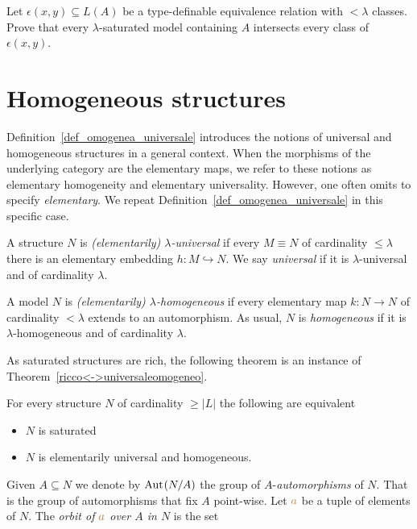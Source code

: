 \begin{exercise}
  Let $\epsilon(x,y)\subseteq L(A)$ be a type-definable equivalence relation with $<\lambda$ classes.
  Prove that every $\lambda$-saturated model containing $A$ intersects every class of $\epsilon(x,y)$.
\end{exercise}

\section{Homogeneous structures}\label{homogeneous}
Definition~\ref{def_omogenea_universale} introduces the notions of universal and homogeneous structures in a general context.
When the morphisms of the underlying category are the elementary maps, we refer to these notions as elementary homogeneity and elementary universality.
However, one often omits to specify \textit{elementary}. 
We repeat Definition~\ref{def_omogenea_universale} in this specific case. 

\begin{definition}
A structure $N$ is \emph{(elementarily) $\lambda$-universal\/} if every $M\equiv N$ of cardinality $\le\lambda$ there is an elementary embedding $h:M\hookrightarrow N$.
We say \emph{universal\/} if it is $\lambda$-universal and of cardinality $\lambda$.\smallskip

A model $N$ is \emph{(elementarily) $\lambda$-homogeneous\/} if every elementary map $k:N\to N$ of cardinality $<\lambda$ extends to an automorphism. 
As usual, $N$ is \emph{homogeneous\/} if it is $\lambda$-homogeneous and of cardinality $\lambda$.
\end{definition}

As saturated structures are rich, the following theorem is an instance of Theorem~\ref{ricco<->universaleomogeneo}.

\begin{theorem}\label{thm_saturo_omogeneouniversale}
For every structure $N$ of cardinality $\ge|L|$ the following are equivalent\nobreak
\begin{itemize}
\item[1.] $N$ is saturated
\item[2.] $N$ is elementarily universal and homogeneous.
\end{itemize}
\end{theorem}

Given $A\subseteq N$ we denote by \emph{${\rm Aut\kern.15ex}(N/A)$\/} the group of \emph{$A\mbox{-}$automorphisms\/} of $N$. That is the group of automorphisms that fix $A$ point-wise.
Let ${\color{brown} a}$ be a tuple of elements of $N$. The \emph{orbit of ${\color{brown} a}$ over $A$ in $N$} is the set


